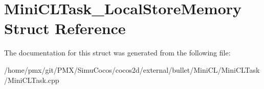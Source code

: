 \hypertarget{structMiniCLTask__LocalStoreMemory}{}\section{Mini\+C\+L\+Task\+\_\+\+Local\+Store\+Memory Struct Reference}
\label{structMiniCLTask__LocalStoreMemory}


The documentation for this struct was generated from the following file\+:\begin{DoxyCompactItemize}
\item 
/home/pmx/git/\+P\+M\+X/\+Simu\+Cocos/cocos2d/external/bullet/\+Mini\+C\+L/\+Mini\+C\+L\+Task/Mini\+C\+L\+Task.\+cpp\end{DoxyCompactItemize}
